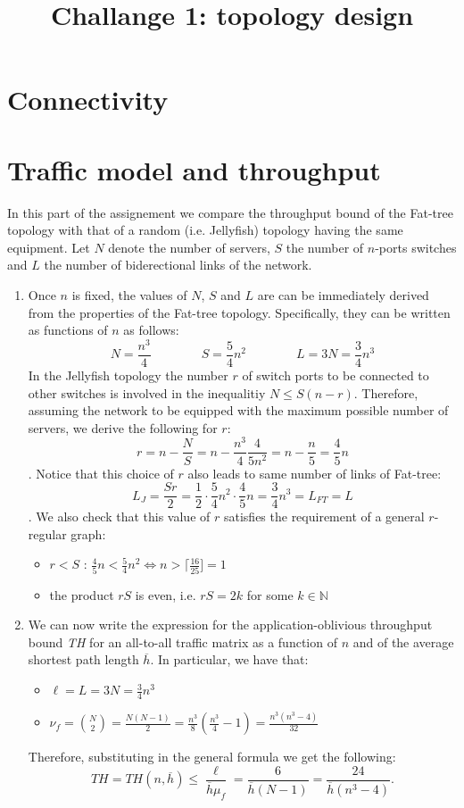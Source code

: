 \documentclass[a4paper,12pt]{article}
\title{Challange 1: topology design}
\author{}
\begin{document}
\section{Connectivity}
\clearpage

\section{Traffic model and throughput}
In this part of the assignement we compare the throughput bound of the Fat-tree topology with that of a random (i.e. Jellyfish) topology having the same equipment. 
Let $N$ denote the number of servers, $S$ the number of $n$-ports switches and $L$ the number of biderectional links of the network.

\begin{enumerate}
 \item Once $n$ is fixed, the values of $N$, $S$ and $L$ are can be immediately derived from the properties of the Fat-tree topology.
 Specifically, they can be written as functions of $n$ as follows:
 $$ N = \frac{n^3}{4}\qquad\qquad S=\frac{5}{4}n^2 \qquad\qquad L = 3N =\frac{3}{4}n^3  $$
 In the Jellyfish topology the number $r$ of switch ports to be connected to other switches is involved in the inequalitiy $N \leq S(n-r)$.
 Therefore, assuming the network to be equipped with the maximum possible number of servers, we derive the following for $r$:
 $$ r = n-\frac{N}{S} = n-\frac{n^3}{4}\frac{4}{5n^2}=n-\frac{n}{5} = \frac{4}{5}n$$.
 Notice that this choice of $r$ also leads to same number of links of Fat-tree:
 $$ L_J = \frac{Sr}{2} = \frac{1}{2}\cdot\frac{5}{4}n^2\cdot\frac{4}{5}n = \frac{3}{4}n^3 = L_{FT} = L$$.
 We also check that this value of $r$ satisfies the requirement of a general $r$-regular graph: 
 \begin{itemize}
  \item $r<S$ : $\frac{4}{5}n <\frac{5}{4}n^2 \Leftrightarrow n > \lceil\frac{16}{25}] = 1$
  \item the product $rS$ is even, i.e. $rS=2k$ for some $k\in \mathbb{N}$
  \end{itemize}

  \item We can now write the expression for the application-oblivious throughput bound \textit{TH} for an all-to-all traffic matrix as a function of $n$ and of the average shortest path length $\overline{h}$.
  In particular, we have that:
  \begin{itemize}
   \item $\ell = L = 3N = \frac{3}{4}n^3$
   \item $\nu_f = \binom{N}{2} =\frac{N(N-1)}{2} = \frac{n^3}{8}(\frac{n^3}{4}-1) = \frac{n^3(n^3-4)}{32} $
  \end{itemize}
 Therefore, substituting in the general formula we get the following:
 $$ TH = TH(n,\overline{h}) \leq \frac{\ell}{\overline{h}\mu_f}= \frac{6}{\overline{h} (N-1)} = \frac{24}{\overline{h}(n^3-4)}. $$


\end{enumerate}
\end{document}
